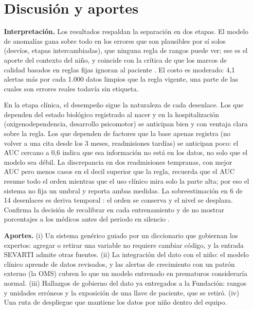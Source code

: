 \section{Discusión y aportes}
\label{sec:discusion}

\textbf{Interpretación.} Los resultados respaldan la separación en dos etapas. El modelo de anomalías gana sobre todo en los errores que son plausibles por sí solos (desvíos, etapas intercambiadas), que ninguna regla de rangos puede ver; ese es el aporte del contexto del niño, y coincide con la crítica de que los marcos de calidad basados en reglas fijas ignoran al paciente \cite{kahn2016,weiskopf2013}. El costo es moderado: 4,1 alertas más por cada 1.000 datos limpios que la regla vigente, una parte de las cuales son errores reales todavía sin etiqueta.

En la etapa clínica, el desempeño sigue la naturaleza de cada desenlace. Los que dependen del estado biológico registrado al nacer y en la hospitalización (oxigenodependencia, desarrollo psicomotor) se anticipan bien y con ventaja clara sobre la regla. Los que dependen de factores que la base apenas registra (no volver a una cita desde los 3 meses, readmisiones tardías) se anticipan poco: el AUC cercano a 0,6 indica que esa información no está en los datos, no solo que el modelo sea débil. La discrepancia en dos readmisiones tempranas, con mejor AUC pero menos casos en el decil superior que la regla, recuerda que el AUC resume todo el orden mientras que el uso clínico mira solo la parte alta; por eso el sistema no fija un umbral y reporta ambas medidas. La sobreestimación en 6 de 14 desenlaces es deriva temporal \cite{davis2017}: el orden se conserva y el nivel se desplaza. Confirma la decisión de recalibrar en cada entrenamiento y de no mostrar porcentajes a los médicos antes del periodo en silencio \cite{vancalster2019,wong2021}.

\textbf{Aportes.} (i) Un sistema genérico guiado por un diccionario que gobiernan los expertos: agregar o retirar una variable no requiere cambiar código, y la entrada SEVARTI admite otras fuentes. (ii) La integración del dato con el niño: el modelo clínico aprende de datos revisados, y las alertas de crecimiento con un patrón externo (la OMS) cubren lo que un modelo entrenado en prematuros consideraría normal. (iii) Hallazgos de gobierno del dato ya entregados a la Fundación: rangos y unidades erróneos y la exposición de una llave de paciente, que se retiró. (iv) Una ruta de despliegue que mantiene los datos por niño dentro del equipo.

